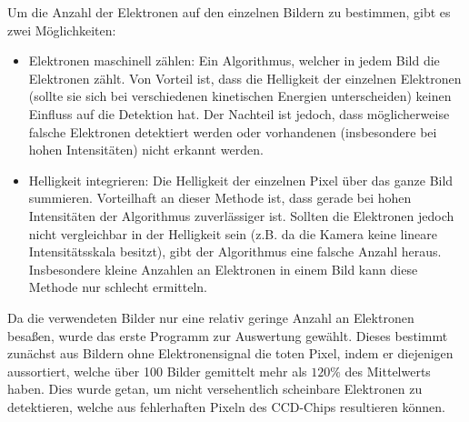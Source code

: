 \documentclass[bachelor,       %
               twoside,        %
               BCOR10mm,       %
               english,ngerman, %
               final,          %
               ]{GAUBM}
\begin{document}
Um die Anzahl der Elektronen auf den einzelnen Bildern zu bestimmen, gibt es zwei Möglichkeiten:
\begin{itemize}
\item Elektronen maschinell zählen: Ein Algorithmus, welcher in jedem Bild die Elektronen zählt.
	Von Vorteil ist, dass die Helligkeit der einzelnen Elektronen (sollte sie sich bei verschiedenen kinetischen Energien unterscheiden) keinen Einfluss auf die Detektion hat.
	Der Nachteil ist jedoch, dass möglicherweise falsche Elektronen detektiert werden oder vorhandenen (insbesondere bei hohen Intensitäten) nicht erkannt werden.
\item Helligkeit integrieren: Die Helligkeit der einzelnen Pixel über das ganze Bild summieren.
	Vorteilhaft an dieser Methode ist, dass gerade bei hohen Intensitäten der Algorithmus zuverlässiger ist.
	Sollten die Elektronen jedoch nicht vergleichbar in der Helligkeit sein (z.B. da die Kamera keine lineare Intensitätsskala besitzt),  gibt der Algorithmus eine falsche Anzahl heraus.
	Insbesondere kleine Anzahlen an Elektronen in einem Bild kann diese Methode nur schlecht ermitteln.
\end{itemize}

Da die verwendeten Bilder nur eine relativ geringe Anzahl an Elektronen besaßen, wurde das erste Programm zur Auswertung gewählt.
Dieses bestimmt zunächst aus Bildern ohne Elektronensignal die toten Pixel, indem er diejenigen aussortiert, welche über 100 Bilder gemittelt mehr als $120\%$ des Mittelwerts haben.
Dies wurde getan, um nicht versehentlich scheinbare Elektronen zu detektieren, welche aus fehlerhaften Pixeln des CCD-Chips resultieren können.
\end{document}
